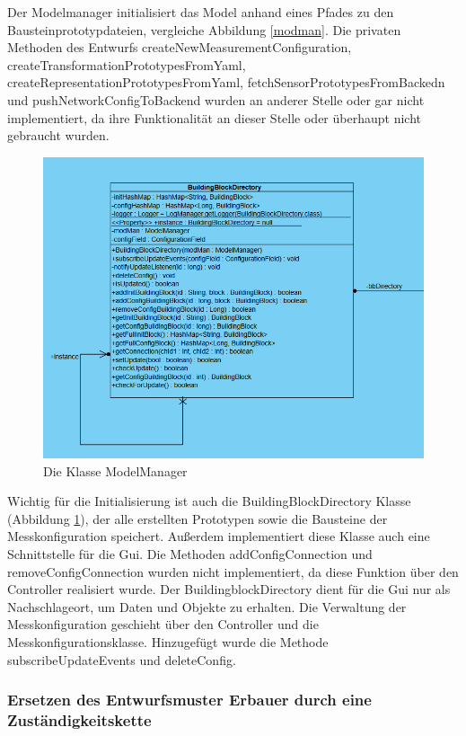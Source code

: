 \documentclass[parskip=full]{scrartcl}
\begin{document}
Der Modelmanager initialisiert das Model anhand eines Pfades zu den Bausteinprototypdateien, vergleiche Abbildung \ref{modman}. Die privaten Methoden des Entwurfs createNewMeasurementConfiguration, createTransformationPrototypesFromYaml, createRepresentationPrototypesFromYaml, fetchSensorPrototypesFromBackedn und pushNetworkConfigToBackend wurden an anderer Stelle oder gar nicht implementiert, da ihre Funktionalität an dieser Stelle oder überhaupt nicht gebraucht wurden.

\begin{figure}[htbp]
	\begin{center}
		\includegraphics[width = 14cm]{Grafiken/bbdir.PNG}
		\caption{Die Klasse ModelManager}
		\label{bbdir}
	\end{center}
\end{figure}


Wichtig für die Initialisierung ist auch die BuildingBlockDirectory Klasse (Abbildung \ref{bbdir}), der alle erstellten Prototypen sowie die Bausteine der Messkonfiguration speichert. Außerdem implementiert diese Klasse auch eine Schnittstelle für die Gui. Die Methoden addConfigConnection und removeConfigConnection wurden nicht implementiert, da diese Funktion über den Controller realisiert wurde. Der BuildingblockDirectory dient für die Gui nur als Nachschlageort, um Daten und Objekte zu erhalten. Die Verwaltung der Messkonfiguration geschieht über den Controller und die Messkonfigurationsklasse. Hinzugefügt wurde die Methode subscribeUpdateEvents und deleteConfig.


\subsubsection{Ersetzen des Entwurfsmuster Erbauer durch eine Zuständigkeitskette}
\end{document}

